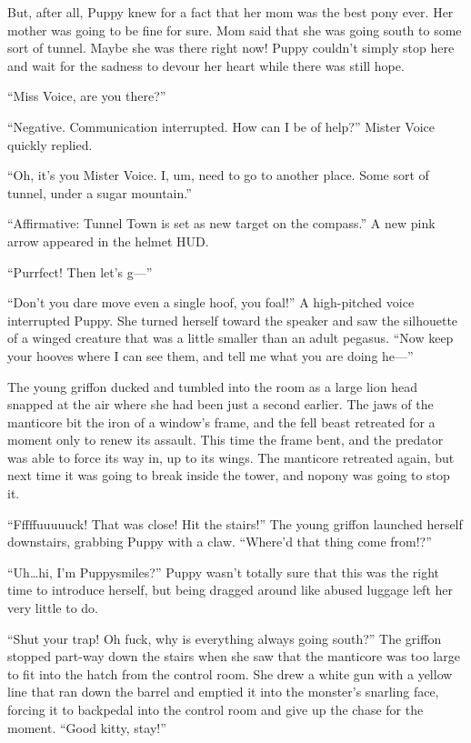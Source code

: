 But, after all, Puppy knew for a fact that her mom was the best pony ever. Her mother was going to be fine for sure. Mom said that she was going south to some sort of tunnel. Maybe she was there right now! Puppy couldn't simply stop here and wait for the sadness to devour her heart while there was still hope.

``Miss Voice, are you there?''

{\mten ``Negative. Communication interrupted. How can I be of help?'' Mister Voice quickly replied.}

``Oh, it's you Mister Voice. I, um, need to go to another place. Some sort of tunnel, under a sugar mountain.''

{\mten ``Affirmative: Tunnel Town is set as new target on the compass.'' A new pink arrow appeared in the helmet HUD.}

``Purrfect! Then let's g---''

``Don't you dare move even a single hoof, you foal!'' A high-pitched voice interrupted Puppy. She turned herself toward the speaker and saw the silhouette of a winged creature that was a little smaller than an adult pegasus. ``Now keep your hooves where I can see them, and tell me what you are doing he---'' 


The young griffon ducked and tumbled into the room as a large lion head snapped at the air where she had been just a second earlier. The jaws of the manticore bit the iron of a window's frame, and the fell beast retreated for a moment only to renew its assault. This time the frame bent, and the predator was able to force its way in, up to its wings. The manticore retreated again, but next time it was going to break inside the tower, and nopony was going to stop it.

``Fffffuuuuuck! That was close! Hit the stairs!'' The young griffon launched herself downstairs, grabbing Puppy with a claw. ``Where'd that thing come from!?''

``Uh\dots hi, I'm Puppysmiles?'' Puppy wasn't totally sure that this was the right time to introduce herself, but being dragged around like abused luggage left her very little to do.

``Shut your trap! Oh fuck, why is everything always going south?'' The griffon stopped part-way down the stairs when she saw that the manticore was too large to fit into the hatch from the control room. She drew a white gun with a yellow line that ran down the barrel and emptied it into the monster's snarling face, forcing it to backpedal into the control room and give up the chase for the moment. ``Good kitty, stay!''

